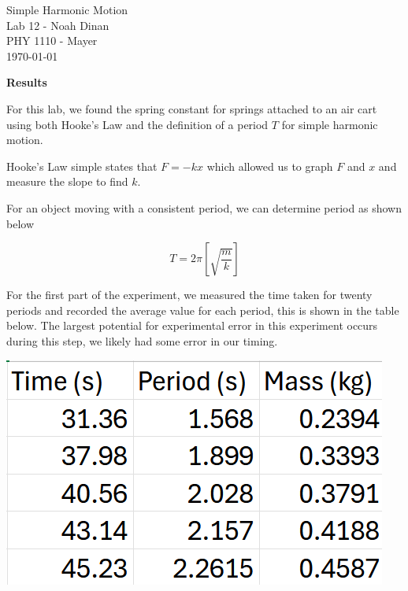 \documentclass[12pt]{article}
\begin{document}
\begin{center}
\vspace*{\fill}
Simple Harmonic Motion \\ Lab 12 - Noah Dinan \\ PHY 1110 - Mayer \\ \today \\
\vspace*{\fill}
\end{center}

\newpage
{} %
\setlength{\parindent}{0in}

\textbf{Results}\vspace{1em}

For this lab, we found the spring constant for springs attached to an air cart using both
Hooke's Law and the definition of a period $T$ for simple harmonic motion.

Hooke's Law simple states that $F=-kx$ which allowed us to graph $F$ and $x$ and measure the slope to find $k$.

For an object moving with a consistent period, we can determine period as shown below

\[ T = 2\pi [\sqrt{\frac{m}{k}}] \]

For the first part of the experiment, we measured the time taken for twenty periods and recorded the average
value for each period, this is shown in the table below. The largest potential for experimental error in this
experiment occurs during this step, we likely had some error in our timing.

\vspace{1em}
\begin{center}
    \includegraphics[scale=0.4]{table_12_1.png}
\end{center}
\vspace{1em}
\end{document}
